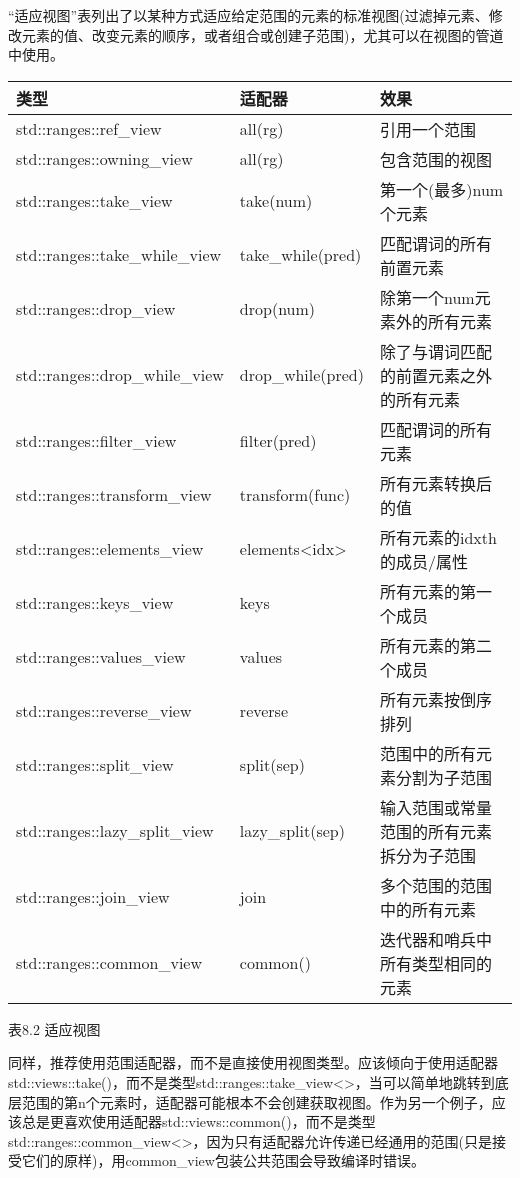 “适应视图”表列出了以某种方式适应给定范围的元素的标准视图(过滤掉元素、修改元素的值、改变元素的顺序，或者组合或创建子范围)，尤其可以在视图的管道中使用。


\begin{longtable}[c]{|l|l|l|}
\hline
\textbf{类型}                & \textbf{适配器} & \textbf{效果}                               \\ \hline
\endfirsthead
%
\endhead
%
std::ranges::ref\_view       & all(rg)          & 引用一个范围                          \\ \hline
std::ranges::owning\_view    & all(rg)          & 包含范围的视图                       \\ \hline
std::ranges::take\_view      & take(num)        & 第一个(最多)num个元素                \\ \hline
std::ranges::take\_while\_view & take\_while(pred)                    & 匹配谓词的所有前置元素                   \\ \hline
std::ranges::drop\_view      & drop(num)        & 除第一个num元素外的所有元素            \\ \hline
std::ranges::drop\_while\_view & drop\_while(pred)                    & 除了与谓词匹配的前置元素之外的所有元素            \\ \hline
std::ranges::filter\_view    & filter(pred)     & 匹配谓词的所有元素           \\ \hline
std::ranges::transform\_view & transform(func)  & 所有元素转换后的值        \\ \hline
std::ranges::elements\_view    & elements\textless{}idx\textgreater{} & 所有元素的idxth的成员/属性                       \\ \hline
std::ranges::keys\_view      & keys             & 所有元素的第一个成员              \\ \hline
std::ranges::values\_view    & values           & 所有元素的第二个成员             \\ \hline
std::ranges::reverse\_view   & reverse          & 所有元素按倒序排列                 \\ \hline
std::ranges::split\_view     & split(sep)       & 范围中的所有元素分割为子范围 \\ \hline
std::ranges::lazy\_split\_view & lazy\_split(sep)                     & 输入范围或常量范围的所有元素拆分为子范围 \\ \hline
std::ranges::join\_view      & join             & 多个范围的范围中的所有元素    \\ \hline
std::ranges::common\_view      & common()                             & 迭代器和哨兵中所有类型相同的元素          \\ \hline
\end{longtable}

\begin{center}
表8.2 适应视图
\end{center}

同样，推荐使用范围适配器，而不是直接使用视图类型。应该倾向于使用适配器std::views::take()，而不是类型std::ranges::take\_view<>，当可以简单地跳转到底层范围的第n个元素时，适配器可能根本不会创建获取视图。作为另一个例子，应该总是更喜欢使用适配器std::views::common()，而不是类型std::ranges::common\_view<>，因为只有适配器允许传递已经通用的范围(只是接受它们的原样)，用common\_view包装公共范围会导致编译时错误。





